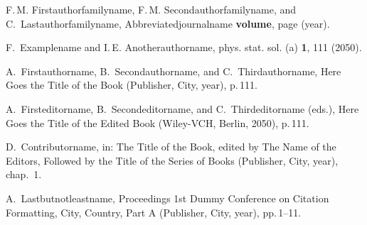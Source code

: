 \documentclass[pamm,a4paper,fleqn]{w-art}
\begin{document}
\begin{thebibliography}{1}

% 
 F.\,M. Firstauthorfamilyname, F.\,M. Secondauthorfamilyname, and
  C.~Lastauthorfamilyname,
 Abbreviatedjournalname \textbf{volume}, page (year).

% 
 F.~Examplename and  I.\,E. Anotherauthorname,
 phys. stat. sol. (a) \textbf{1}, 111 (2050).

% 
 A.~Firstauthorname,  B.~Secondauthorname,  and
  C.~Thirdauthorname,
Here Goes the Title of the Book (Publisher, City, year), p.\,111.

% 
 A.~Firsteditorname,  B.~Secondeditorname,  and
  C.~Thirdeditorname (eds.),
Here Goes the Title of the Edited Book (Wiley-VCH, Berlin, 2050), p.\,111.

% 
 D.~Contributorname,
 in: The Title of the Book, edited by The Name of the Editors, Followed by
  the Title of the Series of Books (Publisher, City, year), chap.~1.

% 
 A.~Lastbutnotleastname,
 Proceedings 1st Dummy Conference on Citation Formatting, City,
  Country, Part A (Publisher, City, year),  pp.\,1--11.

\end{thebibliography}
\end{document}
